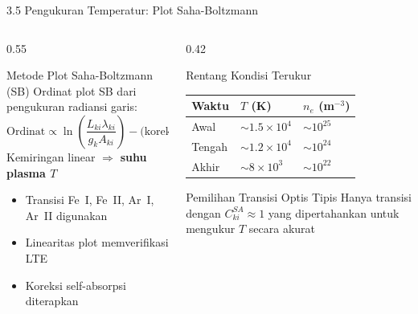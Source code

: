 \documentclass[aspectratio=169, 10pt]{beamer}
\begin{document}
\begin{frame}{3.5 Pengukuran Temperatur: Plot Saha-Boltzmann}
  \begin{columns}[T]
    \begin{column}{0.55\textwidth}
      \begin{block}{Metode Plot Saha-Boltzmann (SB)}
        \small
        Ordinat plot SB dari pengukuran radiansi garis:
        \[\text{Ordinat} \propto \ln\!\left(\frac{L_{ki}\lambda_{ki}}{g_k A_{ki}}\right) - \text{(koreksi $n_e$)}\]
        Kemiringan linear $\Rightarrow$ \textbf{suhu plasma $T$}\\[4pt]
        \begin{itemize}
          \item Transisi Fe~I, Fe~II, Ar~I, Ar~II digunakan
          \item Linearitas plot memverifikasi LTE
          \item Koreksi self-absorpsi diterapkan
        \end{itemize}
      \end{block}
    \end{column}
    \begin{column}{0.42\textwidth}
      \begin{block}{Rentang Kondisi Terukur}
        \begin{center}
          \begin{tabular}{lll}
            \toprule
            Waktu & $T$ (K) & $n_e$ (m$^{-3}$) \\
            \midrule
            Awal & $\sim\!1.5\times10^4$ & $\sim\!10^{25}$ \\
            Tengah & $\sim\!1.2\times10^4$ & $\sim\!10^{24}$ \\
            Akhir & $\sim\!8\times10^3$ & $\sim\!10^{22}$ \\
            \bottomrule
          \end{tabular}
        \end{center}
      \end{block}
      \begin{alertblock}{Pemilihan Transisi Optis Tipis}
        \small
        Hanya transisi dengan $C_{ki}^{SA} \approx 1$ yang dipertahankan untuk mengukur $T$ secara akurat
      \end{alertblock}
    \end{column}
  \end{columns}
\end{frame}

\end{document}
